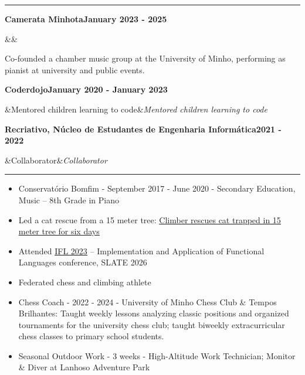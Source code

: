 \documentclass[10pt,a4paper]{article}
\newlength{\cvlabelwidth}\setlength{\cvlabelwidth}{3cm}
\newcommand{\cvlabel}[1]{%
  \raisebox{0pt}[\height][0pt]{\parbox[t]{\cvlabelwidth}{\raggedright\textbf{#1}}}\hfill}
\newcommand{\cvsection}[2]{%
  \par\noindent\textcolor{rulegray}{\rule{\linewidth}{0.4pt}}\par\vspace{5pt}
  \begin{list}{}{\setlength{\leftmargin}{\cvlabelwidth}\setlength{\labelwidth}{\cvlabelwidth}%
      \setlength{\labelsep}{0pt}\setlength{\topsep}{0pt}\setlength{\itemsep}{0pt}%
      \setlength{\parsep}{0pt}}
    \item[{\cvlabel{#1}}]#2
  \end{list}
  \vspace{8pt}
}
\newcommand{\entry}[4]{%
  \textbf{#1}\hfill\textbf{#2}\par
  \ifx&#3&\else\textit{#3}\hfill\textit{#4}\par\fi
}
\newcommand{\gap}{\vspace{5pt}}
\begin{document}
\cvsection{VOLUNTEER}{%
  \entry{Camerata Minhota}{January 2023 - 2025}{}{}
  Co-founded a chamber music group at the University of Minho, performing as pianist at university and public events.\par\gap
  \entry{Coderdojo}{January 2020 - January 2023}{Mentored children learning to code}{}\gap
  \entry{Recriativo, Núcleo de Estudantes de Engenharia Informática}{2021 - 2022}{Collaborator}{}
}


\cvsection{EXTRA-\\CURRICULAR}{%
  \begin{itemize}[topsep=0pt]
    \item Conservatório Bomfim - September 2017 - June 2020 - Secondary Education, Music -- 8th Grade in Piano
    \item Led a cat rescue from a 15 meter tree:
      \href{https://ominho.pt/braga-escalador-resgata-gato-preso-ha-seis-dias-em-arvore-com-15-metros/}{\underline{Climber rescues cat trapped in 15 meter tree for six days}}

    \item Attended \href{https://ifl23.github.io/}{\underline{IFL 2023}} -- Implementation and Application of Functional Languages
        conference, SLATE 2026

    \item Federated chess and climbing athlete

    \item Chess Coach - 2022 - 2024 - University of Minho Chess Club \& Tempos Brilhantes: Taught weekly lessons analyzing classic positions and organized tournaments for the university chess club; taught biweekly extracurricular chess classes to primary school students.\par\gap

    \item Seasonal Outdoor Work - 3 weeks - High-Altitude Work Technician; Monitor \& Diver at Lanhoso Adventure Park\gap



  \end{itemize}
}
\end{document}
